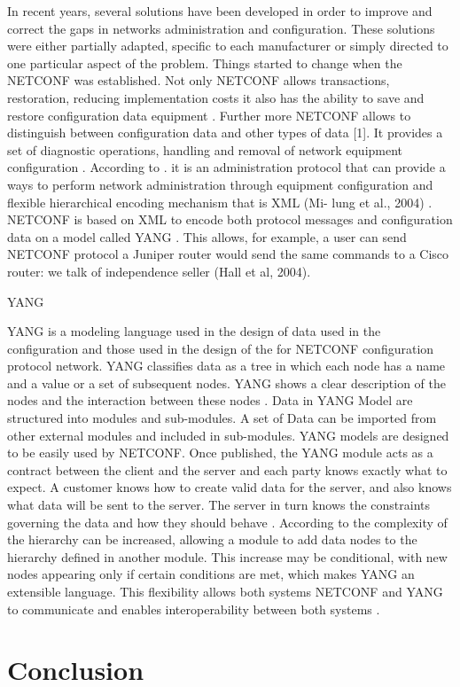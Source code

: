 \documentclass[10pt,conference]{IEEEtran}
\begin{document}
In recent years, several solutions have been developed in order to improve and correct the gaps in networks administration and configuration. These solutions were either partially adapted, specific to each manufacturer or simply directed to one particular aspect of the problem. Things started to change when the NETCONF was established. Not only NETCONF allows transactions, restoration, reducing implementation costs it also has the ability to save and restore configuration data equipment \cite{ Rfc6728}. Further more NETCONF allows to distinguish between configuration data and other types of data [1]. It provides a set of diagnostic operations, handling and removal of network equipment configuration \cite{Rfc6728} \cite{DBLP:conf/ifip1-7/2006}. According to \cite{ref42}. it is an administration protocol that can provide a ways to perform network administration through equipment configuration and flexible hierarchical encoding mechanism that is XML (Mi- lung et al., 2004) \cite{ DBLP:conf/ifip1-7/2006, Halleaformal } .
NETCONF is based on XML to encode both protocol messages and configuration data on a model called YANG \cite{DBLP:conf/rfc6020/2010}. This allows, for example, a user can send NETCONF protocol a Juniper router would send the same commands to a Cisco router: we talk of independence seller (Hall et al, 2004). \cite{ DBLP:conf/infocom/Enns2011}

YANG

YANG is a modeling language used in the design of data used in the configuration and those used in the design of the for NETCONF configuration protocol network.
YANG classifies data as a tree in which each node has a name and a value or a set of subsequent nodes. YANG shows a clear description of the nodes and the interaction between these nodes \cite{DBLP:conf/rfc6020/2010}. Data in YANG Model are structured into modules and sub-modules. A set of Data can be imported from other external modules and included in sub-modules. YANG models are designed to be easily used by NETCONF. Once published, the YANG module acts as a contract between the client and the server and each party knows exactly what to expect. A customer knows how to create valid data for the server, and also knows what data will be sent to the server. The server in turn knows the constraints governing the data and how they should behave \cite{ref1}.
According to \cite{DBLP:conf/rfc6020/2010} the complexity of the hierarchy can be increased, allowing a module to add data nodes to the hierarchy defined in another module. This increase may be conditional, with new nodes appearing only if certain conditions are met, which makes YANG an extensible language. This flexibility allows both systems NETCONF and YANG to communicate and enables interoperability between both systems \cite{DBLP:conf/rfc6020/2010}.




\section{Conclusion}\label{sec:conclusion} %






\end{document}
